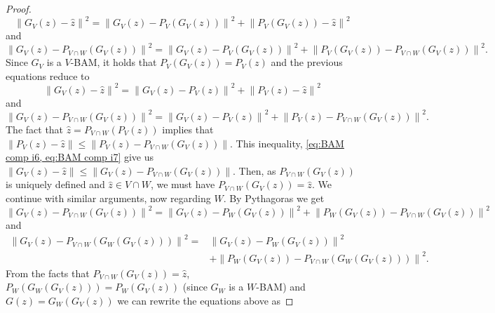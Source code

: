 \documentclass[smallextended,numbook,nospthms]{svjour3}
\theoremstyle{plain}
\theoremstyle{definition}
\begin{document}
\begin{proof}
\begin{equation}
		\left\|G_{V}(z)-\hat{z}\right\|^{2}=\left\|G_{V}(z)-P_{V}\left(G_{V}(z)\right)\right\|^{2}+\left\|P_{V}\left(G_{V}(z)\right)-\hat{z}\right\|^{2}
	\end{equation}
	and
	\begin{equation}\label{eq:BAM comp i5}
		\left\|G_{V}(z)-P_{V \cap W}\left(G_{V}(z)\right)\right\|^{2}=\left\|G_{V}(z)-P_{V}\left(G_{V}(z)\right)\right\|^{2}+\left\|P_{V}\left(G_{V}(z)\right)-P_{V \cap W}\left(G_{V}(z)\right)\right\|^{2}.
	\end{equation}
	Since $G_{V}$ is a $V$-BAM, it holds that $P_{V}\left(G_{V}(z)\right)=P_{V}(z)$ and the previous equations reduce to
	\begin{equation}\label{eq:BAM comp i6}
		\left\|G_{V}(z)-\hat{z}\right\|^{2}=\left\|G_{V}(z)-P_{V}(z)\right\|^{2}+\left\|P_{V}(z)-\hat{z}\right\|^{2}
	\end{equation}
	and
	\begin{equation}\label{eq:BAM comp i7}
		\left\|G_{V}(z)-P_{V \cap W}\left(G_{V}(z)\right)\right\|^{2}=\left\|G_{V}(z)-P_{V}(z)\right\|^{2}+\left\|P_{V}(z)-P_{V \cap W}\left(G_{V}(z)\right)\right\|^{2}.	
	\end{equation}
	The fact that $\hat{z}=P_{V \cap W}\left(P_{V}(z)\right)$ implies that $\left\|P_{V}(z)-\hat{z}\right\| \leq\left\|P_{V}(z)-P_{V \cap W}\left(G_{V}(z)\right)\right\|$. This inequality, \cref{eq:BAM comp i6, eq:BAM comp i7} give us $\left\|G_{V}(z)-\hat{z}\right\| \leq\left\|G_{V}(z)-P_{V \cap W}\left(G_{V}(z)\right)\right\|$. Then, as $P_{V \cap W}\left(G_{V}(z)\right)$ is uniquely defined and $\hat{z} \in V \cap W$, we must have $P_{V \cap W}\left(G_{V}(z)\right)=\hat{z}$.
	We continue with similar arguments, now regarding $W$. By Pythagoras we get
	\begin{equation}\label{eq:BAM comp i8}
		\left\|G_{V}(z)-P_{V \cap W}\left(G_{V}(z)\right)\right\|^{2}=\left\|G_{V}(z)-P_{W}\left(G_{V}(z)\right)\right\|^{2}+\left\|P_{W}\left(G_{V}(z)\right)-P_{V \cap W}\left(G_{V}(z)\right)\right\|^{2}
	\end{equation}
	and
	\begin{align}
		\left\|G_{V}(z)-P_{V \cap W}\left(G_{W}\left(G_{V}(z)\right)\right)\right\|^{2} =&\left\|G_{V}(z)-P_{W}\left(G_{V}(z)\right)\right\|^{2} \\
		&+\left\|P_{W}\left(G_{V}(z)\right)-P_{V \cap W}\left(G_{W}\left(G_{V}(z)\right)\right)\right\|^{2}. \label{eq:BAM comp i9}
	\end{align}
	From the facts that $P_{V \cap W}\left(G_{V}(z)\right)=\hat{z}$, $P_{W}\left(G_{W}\left(G_{V}(z)\right)\right)=P_{W}\left(G_{V}(z)\right)$ (since $G_{W}$ is a $W$-BAM) and $G(z)=G_{W}\left(G_{V}(z)\right)$ we can rewrite the equations above as

\end{proof}
\end{document}
